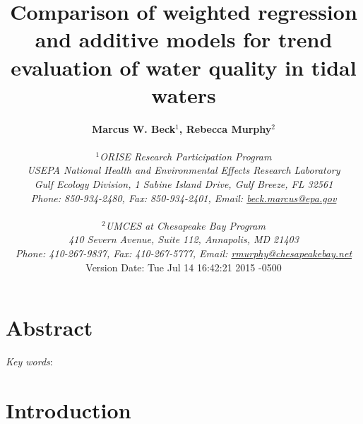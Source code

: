 \documentclass[letterpaper,12pt,oneside]{article}\usepackage[]{graphicx}\usepackage[]{color}
\begin{document}
\raggedbottom
\raggedright
{}
\setlength{\parindent}{0.5in}
\renewcommand\refname{References \vspace{12pt}}

\begin{singlespace}
\title{{\bf {\Large Comparison of weighted regression and additive models for trend evaluation of water quality in tidal waters}}}
\author{
  {\bf {\normalsize Marcus W. Beck$^1$, Rebecca Murphy$^2$}}
  \\\\{\textit {\normalsize $^1$ORISE Research Participation Program}}
  \\{\textit {\normalsize USEPA National Health and Environmental Effects Research Laboratory}}
  \\{\textit {\normalsize Gulf Ecology Division, 1 Sabine Island Drive, Gulf Breeze, FL 32561}}
	\\{\textit {\normalsize Phone: 850-934-2480, Fax: 850-934-2401, Email: \href{mailto:beck.marcus@epa.gov}{beck.marcus@epa.gov}}}
  \\\\{\textit {\normalsize $^2$UMCES at Chesapeake Bay Program}}
	\\{\textit {\normalsize 410 Severn Avenue, Suite 112, Annapolis, MD 21403}}
	\\{\textit {\normalsize Phone: 410-267-9837, Fax: 410-267-5777, Email: \href{mailto:rmurphy@chesapeakbay.net}{rmurphy@chesapeakebay.net}}}
  \vspace{1in} 
  \\ Version Date:   Tue Jul 14 16:42:21 2015 -0500
	}
\date{}
\maketitle
\end{singlespace}
\clearpage

\section*{Abstract}

\noindent \textit{Key words}:

\clearpage

\acresetall

\section{Introduction}
\end{document}
